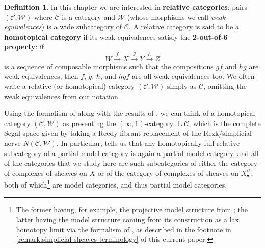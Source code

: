 \documentclass[11pt,fleqn]{article}
\theoremstyle{plain}
\theoremstyle{definition}
\newtheorem{definition}[theorem]{Definition}
\theoremstyle{remark}
\numberwithin{equation}{theorem}
\newcommand{\cover}{\mathcal{U}}
\newcommand{\define}[1]{\textbf{#1}}
\newcommand{\nerve}[1]{X_{#1}^\cover}
\DeclareMathOperator{\LL}{L}
\begin{document}
        \begin{definition}
            In this chapter we are interested in \define{relative categories}: pairs $(\mathcal{C},\mathcal{W})$ where $\mathcal{C}$ is a category and $\mathcal{W}$ (whose morphisms we call \emph{weak equivalences}) is a wide subcategory of $\mathcal{C}$.
            A relative category is said to be a \define{homotopical category} if its weak equivalences satisfy the \define{2-out-of-6 property}: if
            \[
                W\xrightarrow{f}X\xrightarrow{g}Y\xrightarrow{h}Z
            \]
            is a sequence of composable morphisms such that the compositions $gf$ and $hg$ are weak equivalences, then $f$, $g$, $h$, and $hgf$ are all weak equivalences too.
            We often write a relative (or homotopical) category $(\mathcal{C},\mathcal{W})$ simply as $\mathcal{C}$, omitting the weak equivalences from our notation.

            Using the formalism of \cite{Rezk2000} along with the results of \cite{Barwick&Kan2013}, we can think of a homotopical category $(\mathcal{C},\mathcal{W})$ as presenting the $(\infty,1)$-category $\LL{\mathcal{C}}$, which is the complete Segal space given by taking a Reedy fibrant replacement of the Rezk/simplicial nerve $N(\mathcal{C},\mathcal{W})$.
            In particular, \cite[§1.2~(ii)]{Barwick&Kan2013} tells us that any homotopically full relative subcategory of a partial model category is again a partial model category, and all of the categories that we study here are such subcategories of either the category of complexes of sheaves on $X$ or of the category of complexes of sheaves on $\nerve{\bullet}$, both of which\footnote{The former having, for example, the projective model structure from \cite{Hovey2001}; the latter having the model structure coming from its construction as a lax homotopy limit via the formalism of \cite{Bergner2012}, as described in the footnote in \cref{remark:simplicial-sheaves-terminology} of this current paper.} are model categories, and thus partial model categories.
        \end{definition}
\end{document}
